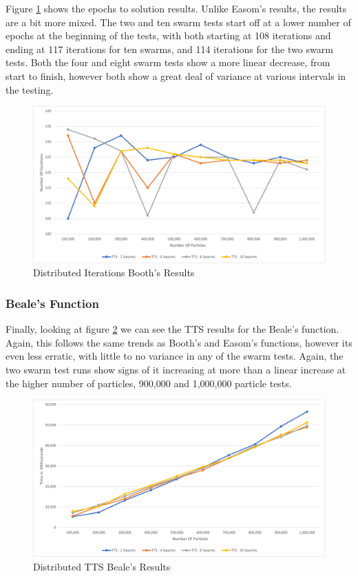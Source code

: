\documentclass[oneside,12pt]{book}
\begin{document}
Figure \ref{fig:Distributed_Epoc_Booths_Results} shows the epochs to solution results. Unlike Easom's results, the results are a bit more mixed. The two and ten swarm tests start off at a lower number of epochs at the beginning of the tests, with both starting at 108 iterations and ending at 117 iterations for ten swarms, and 114 iterations for the two swarm tests. Both the four and eight swarm tests show a more linear decrease, from start to finish, however both show a great deal of variance at various intervals in the testing. 

\begin{figure}[H]
    \centering
    \includegraphics[scale=0.45]{Images/Graphs/DistributedBoothsEpoch.png}
    \caption{Distributed Iterations Booth's Results}
    \label{fig:Distributed_Epoc_Booths_Results}
\end{figure}

\subsubsection{Beale's Function}
Finally, looking at figure \ref{fig:Distributed_TTS_Beale_Results} we can see the TTS results for the Beale's function. Again, this follows the same trends as Booth's and Easom's functions, however its even less erratic, with little to no variance in any of the swarm tests. Again, the two swarm test runs show signs of it increasing at more than a linear increase at the higher number of particles, 900,000 and 1,000,000 particle tests. 
\begin{figure}[H]
    \centering
    \includegraphics[scale=0.45]{Images/Graphs/DistributedBealeTTS.png}
    \caption{Distributed TTS Beale's Results}
    \label{fig:Distributed_TTS_Beale_Results}
\end{figure}
\end{document}
